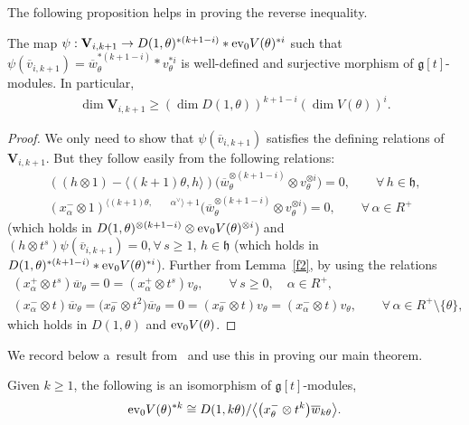 \documentclass[pdftex]{sigma}
\numberwithin{equation}{section}
\begin{document}
The following proposition helps in proving the reverse inequality.
\begin{proposition}
The map $\psi :\mathbf{V}_{i,k+1}\rightarrow D(1,\theta)^{* (k+1-i)} * \textup{ev}_0 V(\theta)^{*i}$ such that
$\psi(\overline{v}_{i,k+1}) = \overline{w}_{\theta}^{* (k+1-i)} * v_{\theta}^{*i}$ is well-defined and surjective
morphism of $\mathfrak{g}[t]$-modules.
In particular,
\begin{gather}
\label{dimg}
\dim \mathbf{V}_{i,k+1}\geq (\dim D(1, \theta))^{k+1-i} (\dim V(\theta))^{i}.
\end{gather}
\end{proposition}
\begin{proof}
We only need to show that $\psi(\overline{v}_{i,k+1})$ satisf\/ies the def\/ining relations of $\mathbf{V}_{i,k+1}$. But
they follow easily from the following relations:
\begin{gather*}
((h \otimes 1)-\langle (k+1)\theta, h\rangle)\big(\overline{w}_{\theta}^{\otimes (k+1-i)} \otimes v_{\theta}^{\otimes i}\big)=0,
\qquad
\forall\, h\in\mathfrak{h},
\\
(x^{-}_{\alpha}\otimes 1)^{\langle (k+1)\theta,
\qquad
\alpha^{\vee} \rangle + 1}\big(\overline{w}_{\theta}^{\otimes (k+1-i)}\otimes v_{\theta}^{\otimes i}\big)=0,
\qquad
\forall\, \alpha\in R^{+}
\end{gather*}
(which holds in $D(1,\theta)^{\otimes (k+1-i)} \otimes \textup{ev}_0 V(\theta)^{\otimes i}$) and $(h \otimes
t^s)\psi(\overline{v}_{i,k+1})=0, \forall\, s\geq 1$, $h\in\mathfrak{h}$
(which holds in $D(1,\theta)^{* (k+1-i)}*\textup{ev}_0 V(\theta)^{*i}$).
Further from Lemma~\ref{f2}, by using the relations
\begin{gather*}
(x^{+}_{\alpha}\otimes t^s)\overline{w}_{\theta}=0=(x^{+}_{\alpha}\otimes t^s)v_{\theta},
\qquad
\forall\, s\geq 0, \quad \alpha\in R^{+},
\\
(x^{-}_{\alpha}\otimes t)\overline{w}_{\theta}=\big(x^{-}_{\theta}\otimes
t^{2}\big)\overline{w}_{\theta}=0=(x^{-}_{\theta}\otimes t)v_{\theta}=(x^{-}_{\alpha}\otimes t)v_{\theta},
\qquad
\forall\, \alpha \in R^{+}\setminus\{\theta\},
\end{gather*}
which holds in $D(1,\theta)$ and $\textup{ev}_0 V(\theta)$.
\end{proof}

We record below a~result from~\cite{F} and use this in proving our main theorem.
\begin{proposition}\textup{\cite[Corollary 2]{F}}
\label{F}
Given $k\geq 1$, the following is an isomorphism of $\mathfrak{g}[t]$-modules,
\begin{gather*}
\textup{ev}_0 V(\theta)^{* k} \cong D(1, k\theta)/\big\langle \big({x^{-}_\theta} \otimes t^{k}\big) \overline{w}_{k\theta}\big\rangle.
\end{gather*}
\end{proposition}
\end{document}

